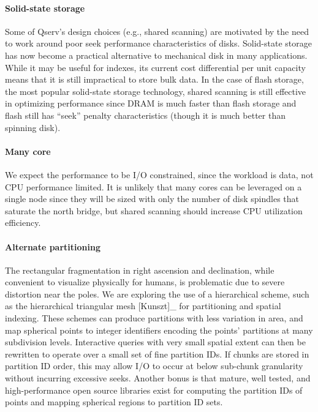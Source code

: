 \documentclass[DM,lsstdraft,toc]{lsstdoc}
\begin{document}
\paragraph{Solid-state storage}\label{solid-state-storage}

Some of Qserv's design choices (e.g., shared scanning) are motivated by
the need to work around poor seek performance characteristics of disks.
Solid-state storage has now become a practical alternative to mechanical
disk in many applications. While it may be useful for indexes, its
current cost differential per unit capacity means that it is still
impractical to store bulk data. In the case of flash storage, the most
popular solid-state storage technology, shared scanning is still
effective in optimizing performance since DRAM is much faster than flash
storage and flash still has ``seek'' penalty characteristics (though it
is much better than spinning disk).

\paragraph{Many core}\label{many-core}

We expect the performance to be I/O constrained, since the workload is
data, not CPU performance limited. It is unlikely that many cores can be
leveraged on a single node since they will be sized with only the number
of disk spindles that saturate the north bridge, but shared scanning
should increase CPU utilization efficiency.

\paragraph{Alternate partitioning}\label{alternate-partitioning}

The rectangular fragmentation in right ascension and declination, while
convenient to visualize physically for humans, is problematic due to
severe distortion near the poles. We are exploring the use of a
hierarchical scheme, such as the hierarchical triangular mesh
{[}Kunszt{]}\_ for partitioning and spatial indexing. These schemes can
produce partitions with less variation in area, and map spherical points
to integer identifiers encoding the points' partitions at many
subdivision levels. Interactive queries with very small spatial extent
can then be rewritten to operate over a small set of fine partition IDs.
If chunks are stored in partition ID order, this may allow I/O to occur
at below sub-chunk granularity without incurring excessive seeks.
Another bonus is that mature, well tested, and high-performance open
source libraries exist for computing the partition IDs of points and
mapping spherical regions to partition ID sets.
\end{document}
